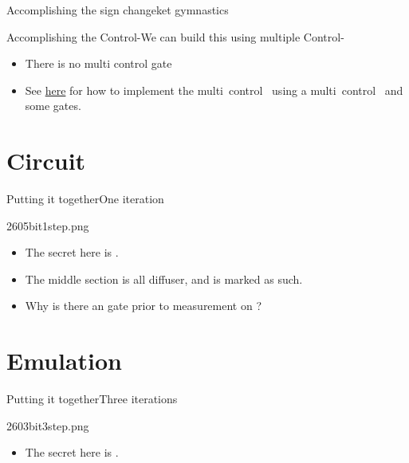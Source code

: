 \begin{Grover}
\begin{frame}{Accomplishing the sign change}{ket gymnastics}
\end{frame}
\begin{frame}{Accomplishing the Control-\PauliZ}{We can build this using multiple Control-\PauliX{}}

\begin{itemize}
    \item There is no multi control \PauliZ{} gate
    \item 
See \href{https://learn.qiskit.org/course/ch-gates/basic-circuit-identities\#c-from-cnot}{here} for how to implement the multi~control~\PauliZ{} using a multi~control~\PauliX{} and some \Hadamard{} gates.
\end{itemize}
\end{frame}
\end{Grover}

\section*{Circuit}

\begin{frame}{Putting it together}{One iteration}

\Vskip{-4em}\begin{center}
\begin{Pixture}[width=0.97\textwidth]{260}{5bit1step.png}
\end{Pixture}
\end{center}
\begin{itemize}
    \item The secret here is .
    \item The middle section is all diffuser, and is marked as such.
    \item Why is there an \Hadamard{} gate prior to measurement on ?
\end{itemize}
    
\end{frame}

\section*{Emulation}
\begin{frame}{Putting it together}{Three iterations}

\Vskip{-4em}\begin{center}
\begin{Pixture}[width=0.8\textwidth]{260}{3bit3step.png}
\end{Pixture}
\end{center}
\begin{itemize}
    \item The secret here is .
\end{itemize}
    
\end{frame}

